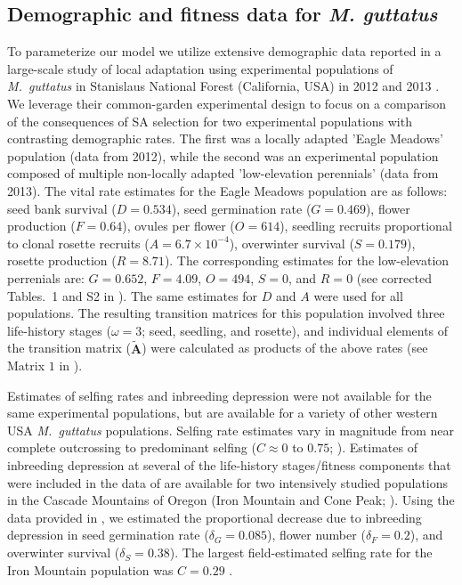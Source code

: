 \documentclass[11pt,draft]{article}
\def\mbf#1{\mathbf{#1}}
\begin{document}
\subsection*{Demographic and fitness data for {\itshape M. guttatus}} \label{subsec:MguttMethods}
To parameterize our model we utilize extensive demographic data reported in a large-scale study of local adaptation using experimental populations of {\itshape M.~guttatus} in Stanislaus National Forest (California, USA) in 2012 and 2013 \citep{PetersonEtAl2016}. We leverage their common-garden experimental design to focus on a comparison of the consequences of SA selection for two experimental populations with contrasting demographic rates. The first was a locally adapted 'Eagle Meadows' population (data from 2012), while the second was an experimental population composed of multiple non-locally adapted 'low-elevation perennials' (data from 2013). The vital rate estimates for the Eagle Meadows population are as follows: seed bank survival ($D = 0.534$), seed germination rate ($G = 0.469$), flower production ($F = 0.64$), ovules per flower ($O = 614$), seedling recruits proportional to clonal rosette recruits ($A = 6.7 \times 10^{-4}$), overwinter survival ($S = 0.179$), rosette production ($R = 8.71$). The corresponding estimates for the low-elevation perrenials are: $G = 0.652$, $F = 4.09$, $O = 494$, $S = 0$, and $R = 0$ (see corrected Tables.~1 and S2 in \citealt{PetersonEtAl2017}). The same estimates for $D$ and $A$ were used for all populations. The resulting transition matrices for this population involved three life-history stages ($\omega = 3$; seed, seedling, and rosette), and individual elements of the transition matrix ($\tilde{\mbf{A}}$) were calculated as products of the above rates (see Matrix $1$ in \citealt{PetersonEtAl2016}).

Estimates of selfing rates and inbreeding depression were not available for the same experimental populations, but are available for a variety of other western USA {\itshape M.~guttatus} populations. Selfing rate estimates vary in magnitude from near complete outcrossing to predominant selfing ($C \approx 0$ to $0.75$; \citealt{RitlandGanders1987, Ritland1990, Willis1999b}). Estimates of inbreeding depression at several of the life-history stages/fitness components that were included in the data of \citet{PetersonEtAl2016} are available for two intensively studied populations in the Cascade Mountains of Oregon (Iron Mountain and Cone Peak; \citealt{Willis1993, Willis1999a, Willis1999b}). Using the data provided in \citet{Willis1993}, we estimated the proportional decrease due to inbreeding depression in seed germination rate ($\delta_{G} = 0.085$), flower number ($\delta_{F} = 0.2$), and overwinter survival ($\delta_{S} = 0.38$). The largest field-estimated selfing rate for the Iron Mountain population was $C = 0.29$ \citep{Willis1993}.
\end{document}
